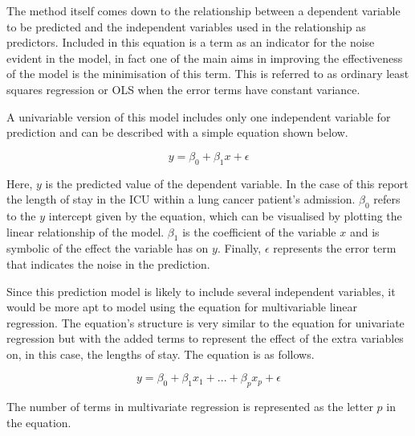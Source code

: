 \documentclass[11pt]{article}
\begin{document}
The method itself comes down to the relationship between a dependent variable to be predicted and the independent variables used in the relationship as predictors\cite{Maulud2020}. Included in this equation is a term as an indicator for the noise evident in the model, in fact one of the main aims in improving the effectiveness of the model is the minimisation of this term. This is referred to as ordinary least squares regression or OLS when the error terms have constant variance.

A univariable version of this model includes only one independent variable for prediction and can be described with a simple equation shown below.

\[y = \beta_0 + \beta_1x +\epsilon\]

Here, \(y\) is the predicted value of the dependent variable. In the case of this report the length of stay in the ICU within a lung cancer patient's admission. \(\beta_0\) refers to the \(y\) intercept given by the equation, which can be visualised by plotting the linear relationship of the model. \(\beta_1\) is the coefficient of the variable \(x\) and is symbolic of the effect the variable has on \(y\). Finally, \(\epsilon\) represents the error term that indicates the noise in the prediction. 

Since this prediction model is likely to include several independent variables, it would be more apt to model using the equation for multivariable linear regression. The equation's structure is very similar to the equation for univariate regression but with the added terms to represent the effect of the extra variables on, in this case, the lengths of stay. The equation is as follows.

\[y = \beta_0 + \beta_1x_1 + ... + \beta_px_p + \epsilon\]

The number of terms in multivariate regression is represented as the letter \(p\) in the equation. 



\end{document}
